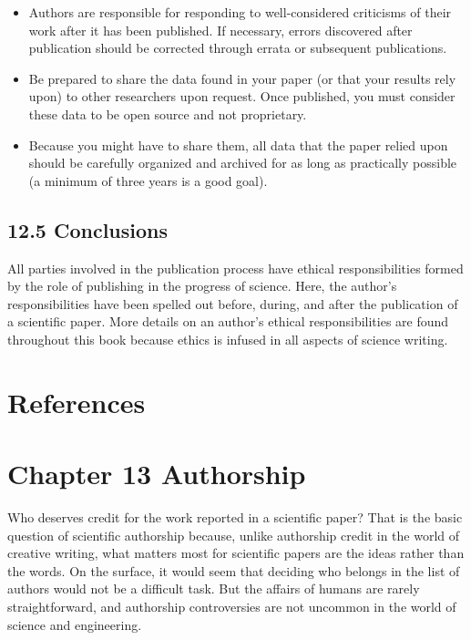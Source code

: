 \begin{itemize}
  \item Authors are responsible for responding to well-considered criticisms of their work after it has been published. If necessary, errors discovered after publication should be corrected through errata or subsequent publications.
  \item Be prepared to share the data found in your paper (or that your results rely upon) to other researchers upon request. Once published, you must consider these data to be open source and not proprietary.
  \item Because you might have to share them, all data that the paper relied upon should be carefully organized and archived for as long as practically possible (a minimum of three years is a good goal).
\end{itemize}

\subsection*{12.5 Conclusions}
All parties involved in the publication process have ethical responsibilities formed by the role of publishing in the progress of science. Here, the author's responsibilities have been spelled out before, during, and after the publication of a scientific paper. More details on an author's ethical responsibilities are found throughout this book because ethics is infused in all aspects of science writing.

\section*{References}
\section*{Chapter 13 Authorship}
Who deserves credit for the work reported in a scientific paper? That is the basic question of scientific authorship because, unlike authorship credit in the world of creative writing, what matters most for scientific papers are the ideas rather than the words. On the surface, it would seem that deciding who belongs in the list of authors would not be a difficult task. But the affairs of humans are rarely straightforward, and authorship controversies are not uncommon in the world of science and engineering.

